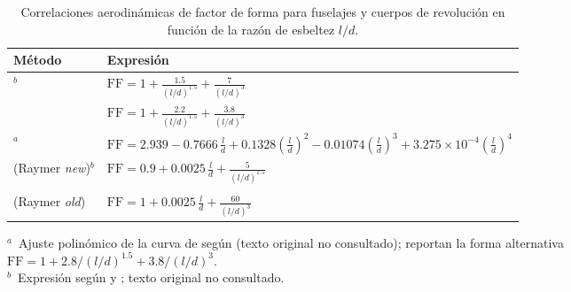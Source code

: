 \begin{table}[htpb]
\centering
\caption{Correlaciones aerodinámicas de factor de forma para fuselajes y
cuerpos de revolución en función de la razón de esbeltez $l/d$.}
\label{tab:aerodinamicos}
\small
\begin{tabularx}{\textwidth}{lX}
\toprule
\textbf{Método} & \textbf{Expresión} \\
\midrule
\citet{hoerner1965drag}$^{b}$ &
$\displaystyle \mathrm{FF} = 1 +
\frac{1{.}5}{(l/d)^{1{.}5}} +
\frac{7}{(l/d)^{3}}$ \\[10pt]

\citet{torenbeek2010synthesis} &
$\displaystyle \mathrm{FF} = 1 +
\frac{2{.}2}{(l/d)^{1{.}5}} +
\frac{3{.}8}{(l/d)^{3}}$ \\[10pt]

\citet{shevell1989fundamentals}$^{a}$ &
$\displaystyle \mathrm{FF} = 2{.}939 - 0{.}7666\,\frac{l}{d} +
0{.}1328\left(\frac{l}{d}\right)^{2}
- 0{.}01074\left(\frac{l}{d}\right)^{3}
+ 3{.}275\times10^{-4}\left(\frac{l}{d}\right)^{4}$ \\[10pt]

\citet{raymer2019aircraft} (Raymer \textit{new})$^{b}$ &
$\displaystyle \mathrm{FF} = 0{.}9 + 0{.}0025\,\frac{l}{d} +
\frac{5}{(l/d)^{1{.}5}}$ \\[10pt]

\begin{tabular}[t]{@{}l@{}}\citet{roskam1987airplane};\\
\citet{raymer1992aircraft} (Raymer \textit{old})\end{tabular} &
$\displaystyle \mathrm{FF} = 1 + 0{.}0025\,\frac{l}{d} +
\frac{60}{(l/d)^{3}}$ \\
\bottomrule
\end{tabularx}

\vspace{0.4em}
{\footnotesize\raggedright
$^{a}$~Ajuste polinómico de la curva de \citet{shevell1989fundamentals}
según \citet{gotten2021form} (texto original no consultado);
\citet{gur2010drag} reportan la forma
alternativa $\mathrm{FF} = 1 + 2{.}8/(l/d)^{1{.}5} + 3{.}8/(l/d)^{3}$.\\
$^{b}$~Expresión según \citet{gotten2021form} y \citet{gur2010drag}; texto
original no consultado.\par}
\end{table}

